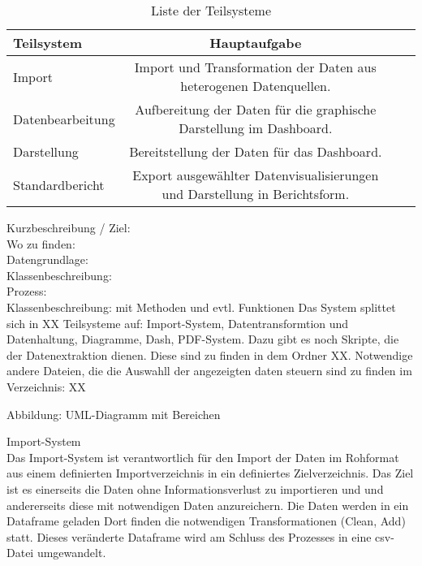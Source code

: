     \begingroup
\setlength{\tabcolsep}{4pt} %
\renewcommand{\arraystretch}{1.5}
\begin{table}[h]
    \centering
    \begin{adjustbox}{max width=\textwidth}
    \Huge
    \begin{tabular}{lccl}
       \toprule
       \textbf{Teilsystem}             &{Hauptaufgabe} \\
       \midrule     
            Import               &Import und Transformation der Daten aus heterogenen Datenquellen.\\
            Datenbearbeitung     &Aufbereitung der Daten für die graphische Darstellung im Dashboard.\\
            Darstellung          &Bereitstellung der Daten für das Dashboard.\\
            Standardbericht      &Export ausgewählter Datenvisualisierungen und Darstellung in Berichtsform.
            
        \bottomrule
    \end{tabular}
    \end{adjustbox}
    \caption{%
        Liste der Teilsysteme
    \label{tab:Teilsysteme}
    }
     \end{table}
\endgroup
    
    
    
    
    Kurzbeschreibung / Ziel:\\
    Wo zu finden:\\
    Datengrundlage:\\
    Klassenbeschreibung:\\
    Prozess:\\
    
    Klassenbeschreibung: mit Methoden und evtl. Funktionen
    Das System splittet sich in XX Teilsysteme auf: Import-System, Datentransformtion und Datenhaltung, Diagramme, Dash, PDF-System. Dazu gibt es noch Skripte,
    die der Datenextraktion dienen. Diese sind zu finden in dem Ordner XX. Notwendige andere Dateien, die die Auswahll der angezeigten daten steuern sind zu finden im Verzeichnis: XX
    
    Abbildung: UML-Diagramm mit Bereichen
    
    
    Import-System\\
    Das Import-System ist verantwortlich für den Import der Daten im Rohformat aus einem definierten Importverzeichnis in ein definiertes Zielverzeichnis. Das Ziel
    ist es einerseits die Daten ohne Informationsverlust zu importieren und und andererseits diese mit notwendigen Daten anzureichern. Die Daten werden in ein Dataframe geladen          Dort finden die notwendigen Transformationen (Clean, Add) statt. Dieses veränderte Dataframe wird am Schluss des Prozesses in eine csv-Datei umgewandelt.
    
